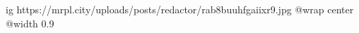  
 
 
 
 

\ifcmt
  ig https://mrpl.city/uploads/posts/redactor/rab8buuhfgaiixr9.jpg
  @wrap center
  @width 0.9
\fi
